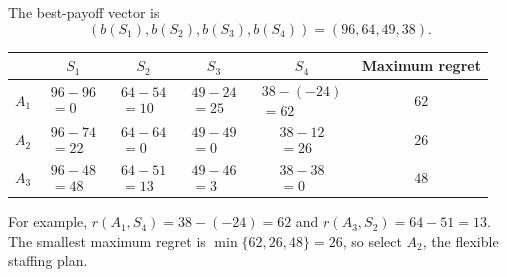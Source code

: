 {		The best-payoff vector is
		\[
		(b(S_1),b(S_2),b(S_3),b(S_4))=(96,64,49,38).
		\]
		\begin{center}\renewcommand{\arraystretch}{1.25}\begin{tabular}{lccccc}\toprule
				&$S_1$&$S_2$&$S_3$&$S_4$&Maximum regret\\ \midrule
				$A_1$&$\begin{gathered}96-96\\=0\end{gathered}$&$\begin{gathered}64-54\\=10\end{gathered}$&$\begin{gathered}49-24\\=25\end{gathered}$&$\begin{gathered}38-(-24)\\=62\end{gathered}$&$62$\\
				$A_2$&$\begin{gathered}96-74\\=22\end{gathered}$&$\begin{gathered}64-64\\=0\end{gathered}$&$\begin{gathered}49-49\\=0\end{gathered}$&$\begin{gathered}38-12\\=26\end{gathered}$&$26$\\
				$A_3$&$\begin{gathered}96-48\\=48\end{gathered}$&$\begin{gathered}64-51\\=13\end{gathered}$&$\begin{gathered}49-46\\=3\end{gathered}$&$\begin{gathered}38-38\\=0\end{gathered}$&$48$\\ \bottomrule\end{tabular}\end{center}
		For example, $r(A_1,S_4)=38-(-24)=62$ and $r(A_3,S_2)=64-51=13$. The smallest maximum regret is $\min\{62,26,48\}=26$, so select $\boxed{A_2}$, the flexible staffing plan.

	}

